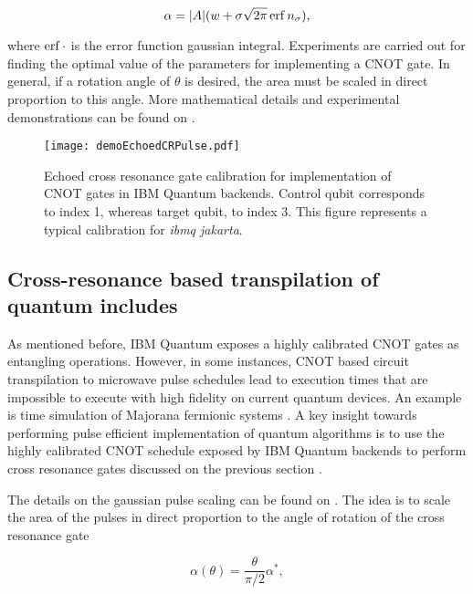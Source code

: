     \begin{equation}
      \alpha = |A|(w + \sigma\sqrt{2\pi}\erf{n_\sigma}),
      \label{eq:StandardPulse}
    \end{equation}
    
    \noindent where $\erf{\cdot}$ is the error function gaussian integral. Experiments are carried out for finding the optimal value of the parameters for implementing a CNOT gate. In general, if a rotation angle of $\theta$ is desired, the area must be scaled in direct proportion to this angle. More mathematical details and experimental demonstrations can be found on \cite{DuplicatedRXZPulse, 2016RZXCalibration, MajoranaSimulation}.

    \begin{figure}
      \centering
      \texttt{[image: demoEchoedCRPulse.pdf]}
      \caption{Echoed cross resonance gate calibration for implementation of CNOT gates in IBM Quantum backends. Control qubit corresponds to index 1, whereas target qubit, to index 3. This figure represents a typical calibration for \textit{ibmq jakarta}.}
      \label{fig:echoedPulseQiskit}
    \end{figure}

  \subsection{Cross-resonance based transpilation of quantum includes}
  \label{subsec:CrossResonanceTranspilation}

    As mentioned before, IBM Quantum exposes a highly calibrated CNOT gates as entangling operations. However, in some instances, CNOT based circuit transpilation to microwave pulse schedules lead to execution times that are impossible to execute with high fidelity on current quantum devices. An example is time simulation of Majorana fermionic systems \cite{MajoranaSimulation}. A key insight towards performing pulse efficient implementation of quantum algorithms is to use the highly calibrated CNOT schedule exposed by IBM Quantum backends to perform cross resonance gates discussed on the previous section \cite{MajoranaSimulation, RXZPulseEfficient}. 
    
    The details on the gaussian pulse scaling can be found on \cite{MajoranaSimulation}. The idea is to scale the area of the pulses in direct proportion to the angle of rotation of the cross resonance gate

    \begin{equation}
      \alpha(\theta) = \frac{\theta}{\pi/2} \alpha^{*},
      \label{eq:SacaleingArea}
    \end{equation}
    
